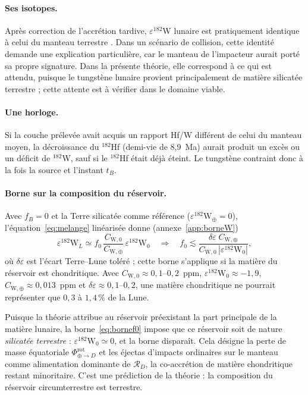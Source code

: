 \documentclass[11pt,a4paper,openany]{report}
\newcommand{\RD}{\mathcal{R}_{D}}
\begin{document}
\paragraph{Ses isotopes.}
Après correction de l'accrétion tardive, $\varepsilon^{182}$W lunaire est pratiquement identique à
celui du manteau terrestre \cite{Kruijer2015,Touboul2015}. Dans un scénario de collision, cette
identité demande une explication particulière, car le manteau de l'impacteur aurait porté sa
propre signature. Dans la présente théorie, elle correspond à ce qui est attendu, puisque le
tungstène lunaire provient principalement de matière silicatée terrestre ; cette attente est à
vérifier dans le domaine viable.

\paragraph{Une horloge.}
Si la couche prélevée avait acquis un rapport Hf/W différent de celui du manteau moyen, la
décroissance du $^{182}$Hf (demi-vie de 8,9~Ma) aurait produit un excès ou un déficit de $^{182}$W,
sauf si le $^{182}$Hf était déjà éteint. Le tungstène contraint donc à la fois la source et l'instant
$t_B$.

\paragraph{Borne sur la composition du réservoir.}
Avec $f_B=0$ et la Terre silicatée comme référence ($\varepsilon^{182}\mathrm{W}_\oplus=0$),
l'équation~\eqref{eq:melange} linéarisée donne (annexe~\ref{app:borneW})
\begin{equation}
\varepsilon^{182}\mathrm{W}_L\simeq f_0\,\frac{C_{\mathrm{W},0}}{C_{\mathrm{W},\oplus}}\,
\varepsilon^{182}\mathrm{W}_0
\quad\Longrightarrow\quad
f_0\lesssim\frac{\delta\varepsilon\;C_{\mathrm{W},\oplus}}{C_{\mathrm{W},0}\,|\varepsilon^{182}\mathrm{W}_0|},
\label{eq:bornef0}
\end{equation}
où $\delta\varepsilon$ est l'écart Terre--Lune toléré ; cette borne s'applique si la matière du réservoir
est chondritique. Avec $C_{\mathrm{W},0}\approx0{,}1$--$0{,}2$~ppm,
$\varepsilon^{182}\mathrm{W}_0\approx-1{,}9$, $C_{\mathrm{W},\oplus}\approx0{,}013$~ppm et
$\delta\varepsilon\approx0{,}1$--$0{,}2$, une matière chondritique ne pourrait représenter que
$0{,}3$ à $1{,}4\,\%$ de la Lune.

\begin{lecture}
Puisque la théorie attribue au réservoir préexistant la part principale de la matière lunaire, la
borne~\eqref{eq:bornef0} impose que ce réservoir soit de nature \emph{silicatée terrestre} :
$\varepsilon^{182}\mathrm{W}_0\simeq0$, et la borne disparaît. Cela désigne la perte de masse
équatoriale $\Phi^{\mathrm{rot}}_{\oplus\to D}$ et les éjectas d'impacts ordinaires sur le manteau comme
alimentation dominante de $\RD$, la co-accrétion de matière chondritique restant minoritaire. C'est
une prédiction de la théorie : la composition du réservoir circumterrestre est terrestre.
\end{lecture}
\end{document}
